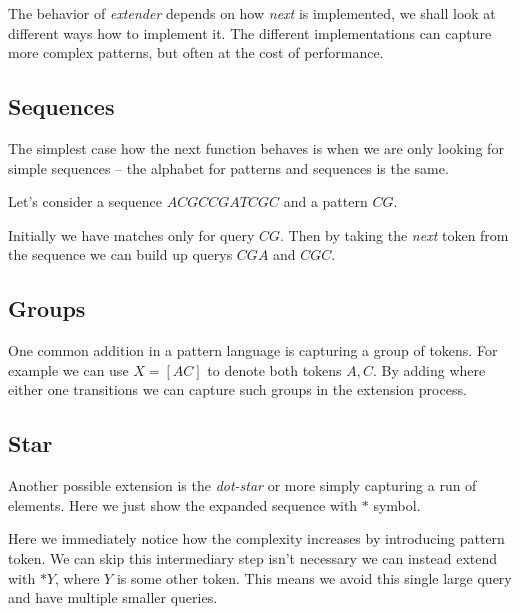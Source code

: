 The behavior of \emph{extender} depends on how \emph{next} is implemented, we shall look at different ways how to implement it. The different implementations can capture more complex patterns, but often at the cost of performance.

\subsection{Sequences}

The simplest case how the next function behaves is when we are only looking for simple sequences -- the alphabet for patterns and sequences is the same.

Let's consider a sequence $ACGCCGATCGC$ and a pattern $CG$.

\begin{figure}[H]
	
\end{figure}

Initially we have matches only for query $CG$. Then by taking the \emph{next} token from the sequence we can build up querys $CGA$ and $CGC$.

\subsection{Groups}

One common addition in a pattern language is capturing a group of tokens. For example we can use $X = [AC]$ to denote both tokens $A, C$. By adding where either one transitions we can capture such groups in the extension process.\

\begin{figure}[H]
	
\end{figure}

\subsection{Star}

Another possible extension is the \emph{dot-star} or more simply capturing a run of elements. Here we just show the expanded sequence with $*$ symbol.

\begin{figure}[H]
	
\end{figure}

Here we immediately notice how the complexity increases by introducing pattern token.  We can skip this intermediary step isn't necessary we can instead extend with $*Y$, where $Y$ is some other token. This means we avoid this single large query and have multiple smaller queries.

